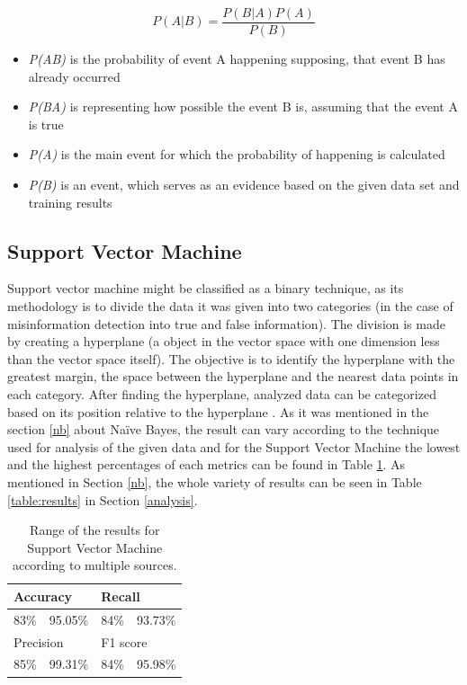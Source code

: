 \documentclass[11pt ,english,a4paper]{article}
\begin{document}
\begin{equation}
P(A|B) = \frac{P(B|A)P(A)}{P(B)}
\end{equation}

\begin{itemize}
\item \emph{P(A\textbar B)} is the probability of event A happening supposing, that event B has already occurred \cite{jo03bayes}
\item \emph{P(B\textbar A)} is representing how possible the event B is, assuming that the event A is true \cite{jo03bayes}
\item \emph{P(A)} is the main event for which the probability of happening is calculated \cite{jo03bayes}
\item \emph{P(B)} is an event, which serves as an evidence based on the given data set and training results \cite{jo03bayes}
\end{itemize}

\subsection{Support Vector Machine}\label{svm}
Support vector machine might be classified as a binary technique, as its methodology is to divide the data it was given into two categories \cite{pod19mach} (in the case of misinformation detection into true and false information). The division is made by creating a hyperplane (a object in the vector space with one dimension less than the vector space itself). The objective is to identify the hyperplane with the greatest margin, the space between the hyperplane and the nearest data points in each category. After finding the hyperplane, analyzed data can be categorized based on its position relative to the hyperplane \cite{sha20mach}.
As it was mentioned in the section \ref{nb} about Naïve Bayes, the result can vary according to the technique used for analysis of the given data and for the Support Vector Machine the lowest and the highest percentages of each metrics can be found in Table \ref{table:svm}. As mentioned in Section \ref{nb}, the whole variety of results can be seen in Table \ref{table:results} in Section \ref{analysis}.

\begin{table}[H]
\centering
\begin{tabular}{|ll|ll|}
\hline
\multicolumn{2}{|l|}{Accuracy}           & \multicolumn{2}{l|}{Recall}      \\ \hline
\multicolumn{1}{|l|}{83\%\cite{chap22unmask}} & 95.05\%\cite{sha20mach} & \multicolumn{1}{l|}{84\%\cite{chap22unmask}} & 93.73\%\cite{sha20mach} \\ \hline
\multicolumn{2}{|l|}{Precision}      & \multicolumn{2}{l|}{F1 score}          \\ \hline
\multicolumn{1}{|l|}{85\%\cite{chap22unmask}} & 99.31\%\cite{bar21health} & \multicolumn{1}{l|}{84\%\cite{chap22unmask}} & 95.98\%\cite{bar21health} \\ \hline
\end{tabular}
\caption{\centering Range of the results for Support Vector Machine according to multiple sources.}
\label{table:svm}
\end{table}
\end{document}
